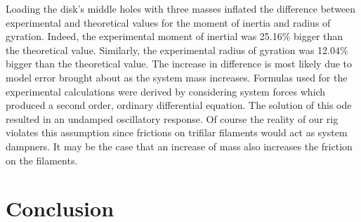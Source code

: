 \documentclass[a4paper]{article}
\begin{document}
Loading the disk's middle holes with three masses inflated the difference between experimental and theoretical values for the moment of inertia and radius of gyration. Indeed, the experimental moment of inertial was 25.16\% bigger than the theoretical value. Similarly, the experimental radius of gyration was 12.04\% bigger than the theoretical value. The increase in difference is most likely due to model error brought about as the system mass increases. Formulas used for the experimental calculations were derived by considering system forces which produced a second order, ordinary differential equation. The solution of this ode resulted in an undamped oscillatory response. Of course the reality of our rig violates this assumption since frictions on trifilar filaments would act as system dampners. It may be the case that an increase of mass also increases the friction on the filaments. 

\section{Conclusion}




\end{document}
